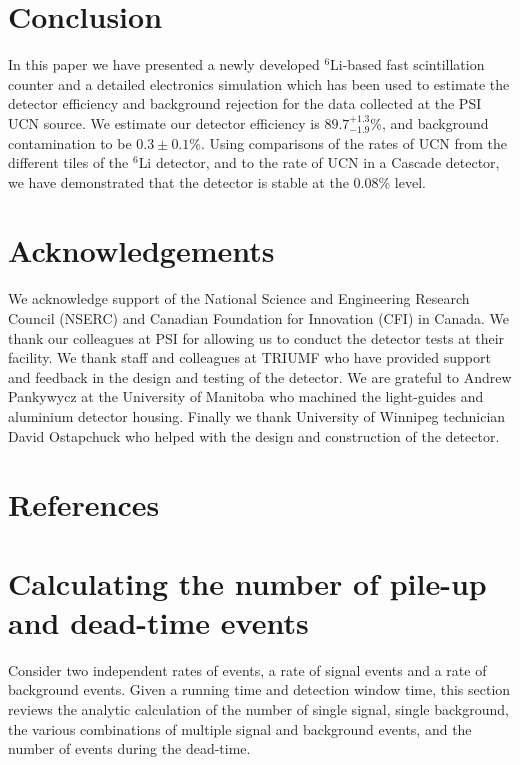 \documentclass[twocolumn]{bmcart}
\begin{document}
\section{Conclusion}

In this paper we have presented a newly developed $^{6}$Li-based fast
scintillation counter and a detailed electronics simulation which has
been used to estimate the detector efficiency and background rejection
for the data collected at the PSI UCN source.  We estimate our
detector efficiency is $89.7^{+1.3}_{-1.9}$\%, and background
contamination to be $0.3\pm0.1$\%.  Using comparisons of the rates of
UCN from the different tiles of the $^{6}$Li detector, and to the rate
of UCN in a Cascade detector, we have demonstrated that the detector
is stable at the 0.08\% level.

\begin{backmatter}

\section{Acknowledgements}

We acknowledge support of the National Science and Engineering
Research Council (NSERC) and Canadian Foundation for Innovation (CFI)
in Canada.  We thank our colleagues at PSI for allowing us to conduct
the detector tests at their facility.  We thank staff and colleagues at
TRIUMF who have provided support and feedback in the design and
testing of the detector.  We are grateful to Andrew Pankywycz at the
University of Manitoba who machined the light-guides and aluminium
detector housing.  Finally we thank University of Winnipeg technician
David Ostapchuck who helped with the design and construction of the
detector.

\section*{References}


%
%
%

\appendix

\section{Calculating the number of pile-up and dead-time events}\label{sec:stats}

Consider two independent rates of events, a rate of signal events and
a rate of background events.  Given a running time and detection
window time, this section reviews the analytic calculation of the
number of single signal, single background, the various combinations
of multiple signal and background events, and the number of events
during the dead-time.


\end{backmatter}
\end{document}
